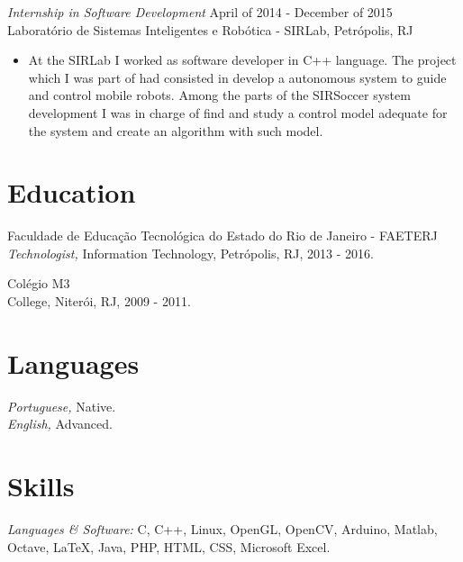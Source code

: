 \documentclass[margin, 10pt]{res} %
\begin{document}
\begin{resume}
{\sl Internship in Software Development} \hfill April of 2014 - December of 2015\\
Laboratório de Sistemas Inteligentes e Robótica - SIRLab, Petrópolis, RJ 
\begin{itemize} \itemsep -2pt %
\item At the SIRLab I worked as software developer in C++ language. The project which I was part of had consisted in develop a autonomous system to guide and control mobile robots. Among the parts of the SIRSoccer system development I was in charge of find and study a control model adequate for the system and create an algorithm with such model.
\end{itemize}


\section{Education}

Faculdade de Educação Tecnológica do Estado do Rio de Janeiro - FAETERJ \\
{\sl Technologist,} Information Technology, Petrópolis, RJ, 2013 - 2016.

Colégio M3 \\
College, Niterói, RJ, 2009 - 2011.
 

\section{Languages}
{\sl Portuguese,} Native.\\
{\sl English,} Advanced.


\section{Skills} 

{\sl Languages \& Software:} C, C++, Linux, OpenGL, OpenCV, Arduino, Matlab, Octave, LaTeX, Java, PHP, HTML, CSS, Microsoft Excel.


\end{resume}
\end{document}
